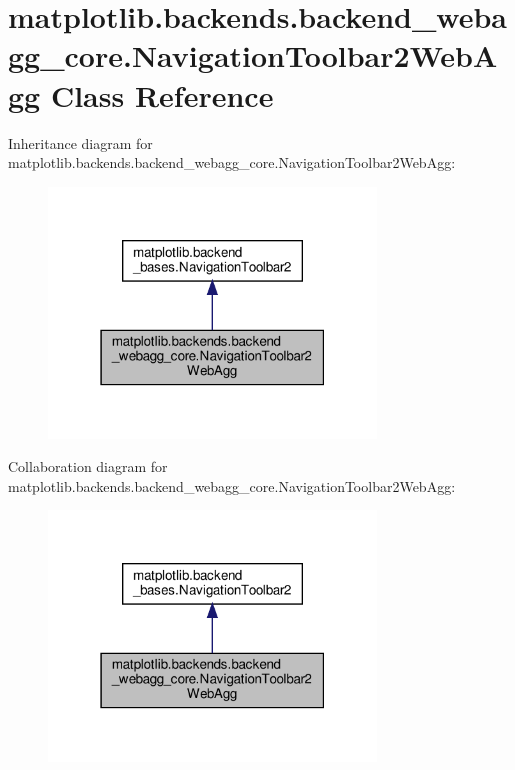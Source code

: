 \hypertarget{classmatplotlib_1_1backends_1_1backend__webagg__core_1_1NavigationToolbar2WebAgg}{}\section{matplotlib.\+backends.\+backend\+\_\+webagg\+\_\+core.\+Navigation\+Toolbar2\+Web\+Agg Class Reference}
\label{classmatplotlib_1_1backends_1_1backend__webagg__core_1_1NavigationToolbar2WebAgg}


Inheritance diagram for matplotlib.\+backends.\+backend\+\_\+webagg\+\_\+core.\+Navigation\+Toolbar2\+Web\+Agg\+:
\nopagebreak
\begin{figure}[H]
\begin{center}
\leavevmode
\includegraphics[width=247pt]{classmatplotlib_1_1backends_1_1backend__webagg__core_1_1NavigationToolbar2WebAgg__inherit__graph}
\end{center}
\end{figure}


Collaboration diagram for matplotlib.\+backends.\+backend\+\_\+webagg\+\_\+core.\+Navigation\+Toolbar2\+Web\+Agg\+:
\nopagebreak
\begin{figure}[H]
\begin{center}
\leavevmode
\includegraphics[width=247pt]{classmatplotlib_1_1backends_1_1backend__webagg__core_1_1NavigationToolbar2WebAgg__coll__graph}
\end{center}
\end{figure}
